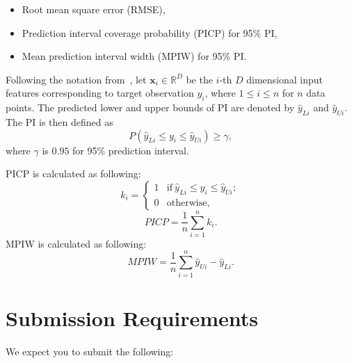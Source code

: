 \documentclass[a4paper, 12pt]{article}
\begin{document}
\begin{itemize}
    \item Root mean square error (RMSE),
    \item Prediction interval coverage probability (PICP) for 95\% PI,
    \item Mean prediction interval width (MPIW) for 95\% PI\@.
\end{itemize}

\noindent
Following the notation from~\citet{pmlr-v80-pearce18a},  let \(\mathbf{x}_{i} \in
\mathbb{R}^{D}\) be the \(i\)-th \(D\) dimensional input features corresponding to target observation
\(y_i\), where \(1 \leq i \leq n\) for \(n\) data points. The predicted lower and upper bounds of PI
are denoted by \(\hat{y}_{Li}\) and \(\hat{y}_{Ui}\). The PI is then defined as
%
\begin{equation*}
P\left(\hat{y}_{L i} \leq y_{i} \leq \hat{y}_{U i}\right) \geq \gamma,
\end{equation*}
%
where \(\gamma\) is \(0.95\) for 95\% prediction interval.

\noindent
PICP is calculated as following:
%
\begin{equation*}
k_i =
\begin{cases}
  1 & \text{if}\ \hat{y}_{Li} \leq y_{i} \leq \hat{y}_{Ui}; \\
  0 & \text{otherwise},
\end{cases}
\end{equation*}
%
\begin{equation*}
PICP = \frac{1}{n}\sum_{i=1}^{n} k_i.
\end{equation*}
%
\noindent
MPIW is calculated as following:
%
\begin{equation*}
MPIW = \frac{1}{n}\sum_{i=1}^{n} \hat{y}_{Ui} - \hat{y}_{Li}.
\end{equation*}

\section{Submission Requirements}\label{sec:SubmissionRequirements}
We expect you to submit the following:
\end{document}
